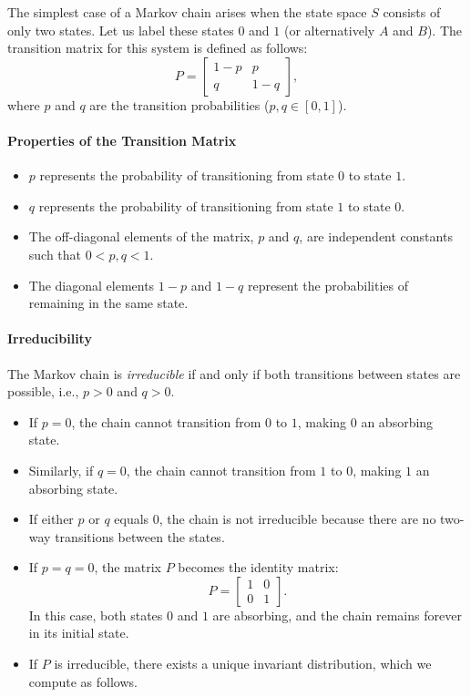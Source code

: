 The simplest case of a Markov chain arises when the state space \( S \) consists of only two states. Let us label these states \( 0 \) and \( 1 \) (or alternatively \( A \) and \( B \)). The transition matrix for this system is defined as follows:
\[
P =
\begin{bmatrix}
1 - p & p \\
q & 1 - q
\end{bmatrix},
\]
where \( p \) and \( q \) are the transition probabilities ($p,q \in [0,1]$).

\paragraph{Properties of the Transition Matrix}
\begin{itemize}
    \item \( p \) represents the probability of transitioning from state \( 0 \) to state \( 1 \).
    \item \( q \) represents the probability of transitioning from state \( 1 \) to state \( 0 \).
    \item The off-diagonal elements of the matrix, \( p \) and \( q \), are independent constants such that \( 0 < p, q < 1 \). 
    \item The diagonal elements \( 1 - p \) and \( 1 - q \) represent the probabilities of remaining in the same state.
\end{itemize}

\paragraph{Irreducibility}
The Markov chain is \textit{irreducible} if and only if both transitions between states are possible, i.e., \( p > 0 \) and \( q > 0 \). 
\begin{itemize}
    \item If \( p = 0 \), the chain cannot transition from \( 0 \) to \( 1 \), making \( 0 \) an absorbing state.
    \item Similarly, if \( q = 0 \), the chain cannot transition from \( 1 \) to \( 0 \), making \( 1 \) an absorbing state.
    \item If either \( p \) or \( q \) equals \( 0 \), the chain is not irreducible because there are no two-way transitions between the states.
    \item If \( p = q = 0 \), the matrix \( P \) becomes the identity matrix:
    \[
    P =
    \begin{bmatrix}
    1 & 0 \\
    0 & 1
    \end{bmatrix}.
    \]
    In this case, both states \( 0 \) and \( 1 \) are absorbing, and the chain remains forever in its initial state.
    \item If \( P \) is irreducible, there exists a unique invariant distribution, which we compute as follows.
\end{itemize}


